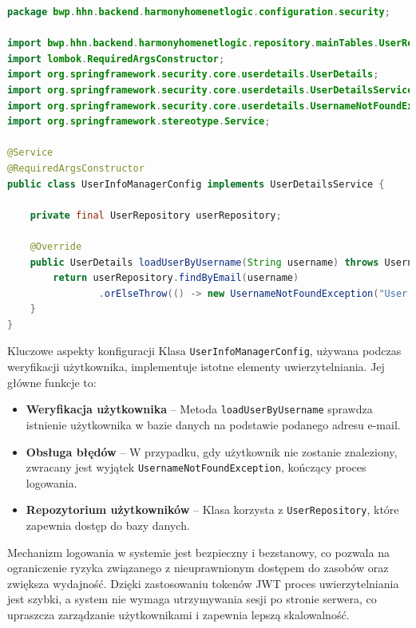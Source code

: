 \begin{lstlisting}[language=Java, style=JavaStyle, caption=Klasa \texttt{UserInfoManagerConfig} odpowiedzialna za zarządzanie użytkownikami]
package bwp.hhn.backend.harmonyhomenetlogic.configuration.security;

import bwp.hhn.backend.harmonyhomenetlogic.repository.mainTables.UserRepository;
import lombok.RequiredArgsConstructor;
import org.springframework.security.core.userdetails.UserDetails;
import org.springframework.security.core.userdetails.UserDetailsService;
import org.springframework.security.core.userdetails.UsernameNotFoundException;
import org.springframework.stereotype.Service;

@Service
@RequiredArgsConstructor
public class UserInfoManagerConfig implements UserDetailsService {

    private final UserRepository userRepository;

    @Override
    public UserDetails loadUserByUsername(String username) throws UsernameNotFoundException {
        return userRepository.findByEmail(username)
                .orElseThrow(() -> new UsernameNotFoundException("User not found"));
    }
}
\end{lstlisting}

\noindent Kluczowe aspekty konfiguracji
Klasa \texttt{UserInfoManagerConfig}, używana podczas weryfikacji użytkownika, implementuje istotne elementy uwierzytelniania. Jej główne funkcje to:
\begin{itemize}
    \item \textbf{Weryfikacja użytkownika} -- Metoda \texttt{loadUserByUsername} sprawdza istnienie użytkownika w bazie danych na podstawie podanego adresu e-mail.
    \item \textbf{Obsługa błędów} -- W przypadku, gdy użytkownik nie zostanie znaleziony, zwracany jest wyjątek \texttt{UsernameNotFoundException}, kończący proces logowania.
    \item \textbf{Repozytorium użytkowników} -- Klasa korzysta z \texttt{UserRepository}, które zapewnia dostęp do bazy danych.
\end{itemize}

Mechanizm logowania w systemie jest bezpieczny i bezstanowy, co pozwala na ograniczenie ryzyka związanego z nieuprawnionym dostępem do zasobów oraz zwiększa wydajność. Dzięki zastosowaniu tokenów JWT proces uwierzytelniania jest szybki, a system nie wymaga utrzymywania sesji po stronie serwera, co upraszcza zarządzanie użytkownikami i zapewnia lepszą skalowalność.

